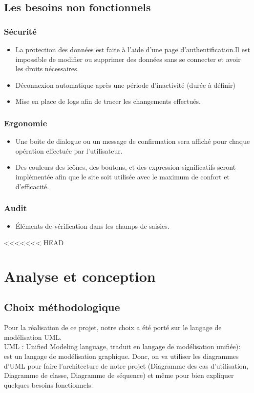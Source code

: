 \documentclass[12pt,a4paper]{article}
\begin{document}
\subsection{Les besoins non fonctionnels}

\subsubsection{Sécurité}
\begin{itemize}
 \item La protection des données est faite à l'aide d'une page d'authentification.Il est impossible de modifier ou supprimer des données sans se connecter et avoir les droits nécessaires. 
 \item Déconnexion automatique après une période d'inactivité (durée à définir)
 \item Mise en place de logs afin de tracer les changements effectués.
\end{itemize}
\subsubsection{Ergonomie}
\begin{itemize}
\item Une boite de dialogue ou un message de confirmation sera affiché pour chaque opération effectuée par l'utilisateur.
\item Des couleurs des icônes, des boutons, et des expression significatifs seront implémentée afin que le site soit utilisée avec le maximum de confort et d'efficacité.
\end{itemize}
\subsubsection{Audit}
\begin{itemize}
\item Éléments de vérification dans les champs de saisies.
\end{itemize}

<<<<<<< HEAD
\section{Analyse et conception}

\subsection{Choix méthodologique}

Pour la réalisation de ce projet, notre choix a été porté sur le langage de modélisation UML.\\
UML : Unified Modeling language, traduit en langage de modélisation unifiée): est un langage de modélisation graphique.
Donc, on va utiliser les diagrammes d'UML pour faire l'architecture de notre projet (Diagramme des cas d'utilisation, Diagramme de classe, Diagramme de séquence) et même pour bien expliquer quelques besoins fonctionnels.\\  
\end{document}
